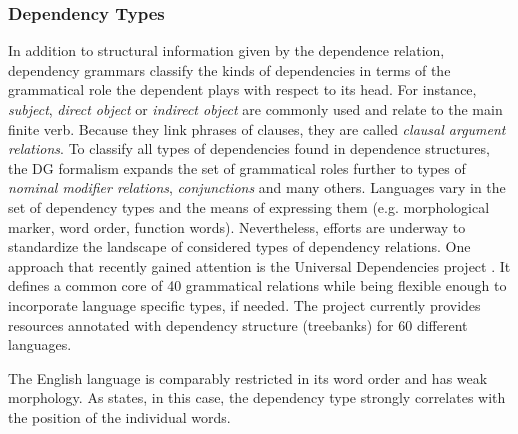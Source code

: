 \subsubsection{Dependency Types} \label{subsec:dependency_types}
In addition to structural  information given by the dependence relation, dependency grammars classify the kinds of dependencies in terms of the grammatical role the dependent plays with respect to its head. For instance, \textit{subject}, \textit{direct object} or \textit{indirect object} are commonly used and relate to the main finite verb. Because they link phrases of clauses, they are called \textit{clausal argument relations}. To classify all types of dependencies found in dependence structures, the \ac{DG} formalism expands the set of grammatical roles further to types of \textit{nominal modifier relations}, \textit{conjunctions} and many others. Languages vary in the set of dependency types and the means of expressing them (e.g. morphological marker, word order, function words). Nevertheless, efforts are underway to standardize the landscape of considered types of dependency relations. One approach that recently gained attention is the Universal Dependencies project \autocite{nivre_universal_2016}. It defines a common core of 40 grammatical relations while being flexible enough to incorporate language specific types, if needed. The project currently provides resources annotated with dependency structure (treebanks) for 60 different languages.

The English language is comparably restricted in its word order and has weak morphology. As \textcite{jurafsky_dependency_2014} states, in this case, the dependency type strongly correlates with the position of the individual words.



